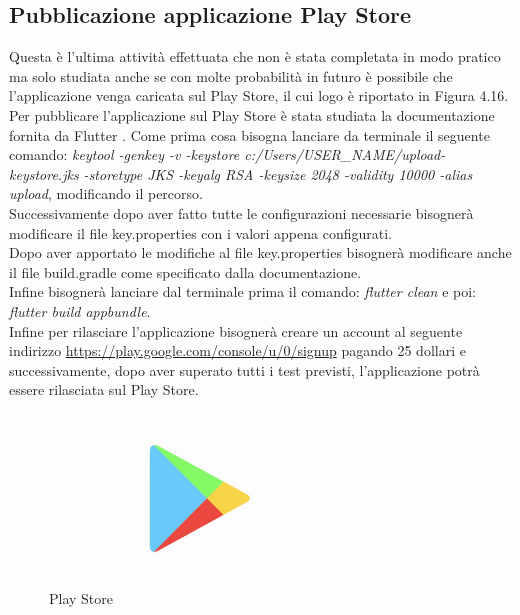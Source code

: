 \subsection{Pubblicazione applicazione Play Store}
Questa è l'ultima attività effettuata che non è stata completata in modo pratico ma solo studiata anche se con molte probabilità in futuro è possibile che l'applicazione venga caricata sul Play Store, il cui logo è riportato in Figura 4.16.\\
Per pubblicare l'applicazione sul Play Store è stata studiata la documentazione fornita da Flutter \cite{pubbps}.
Come prima cosa bisogna lanciare da terminale il seguente comando: \textit{keytool -genkey -v -keystore c:/Users/USER\_NAME/upload-keystore.jks -storetype JKS -keyalg RSA -keysize 2048 -validity 10000 -alias upload}, modificando il percorso.\\
Successivamente dopo aver fatto tutte le configurazioni necessarie bisognerà modificare il file key.properties con i valori appena configurati.\\
Dopo aver apportato le modifiche al file key.properties bisognerà modificare anche il file build.gradle come specificato dalla documentazione.\\
Infine bisognerà lanciare dal terminale prima il comando: \textit{flutter clean} e poi: \textit{flutter build appbundle}.\\
Infine per rilasciare l'applicazione bisognerà creare un account al seguente indirizzo \url{https://play.google.com/console/u/0/signup} pagando 25 dollari e successivamente, dopo aver superato tutti i test previsti, l'applicazione potrà essere rilasciata sul Play Store.\\

\begin{figure}[htbp]	
	\centering
	\includegraphics[width=8cm]{immagini/playstore.jpg}
	\caption{Play Store}
	\label{fig:Play Store}
\end{figure}

